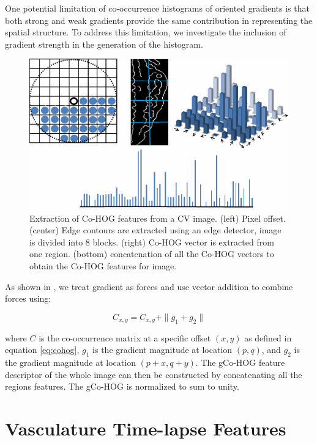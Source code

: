 One potential limitation of co-occurrence histograms of oriented gradients is that both strong and weak gradients provide the same contribution in representing the spatial structure.  To address this limitation, we investigate the inclusion of gradient strength in the generation of the histogram.

\begin{figure}[htb] 
 \centering
\includegraphics[scale=0.75]{figure/cohog.png}
  \caption[Co-HOG features from a CV image]{ Extraction of Co-HOG features from a CV image. (left) Pixel offset. (center) Edge contours are extracted using an edge detector, image is divided into 8 blocks. (right) Co-HOG vector is extracted from one region. (bottom) concatenation of all the Co-HOG vectors to obtain the Co-HOG features for image.}
 \label{cohog}
\end{figure}

As shown in \cite{Pang12}, we treat gradient as forces and use vector addition to combine forces using:
	
				\begin{equation}\label{eq:add}
				C_{x,y} = C_{x,y} + \|g_{1} + g_{2}\| 
				\end{equation}
				\normalsize 
				
where $C$ is the co-occurrence matrix at a specific offset $(x, y)$ as defined in equation \ref{eq:cohog}, $g_{1}$ is the gradient magnitude at location $(p, q)$, and $g_{2}$ is the gradient magnitude at location $(p + x, q + y)$. The gCo-HOG feature descriptor of the whole image can then be constructed by concatenating all the regions features. The gCo-HOG is normalized to sum to unity.

\section{Vasculature Time-lapse Features} \label{sec:timelapse}

